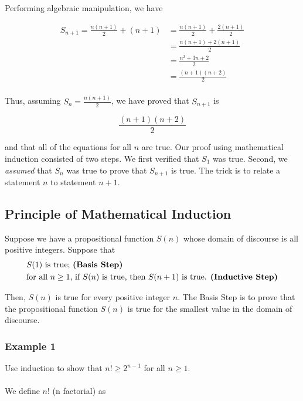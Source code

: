 Performing algebraic manipulation, we have

\begin{align*}
    S_{n + 1} = \frac{n(n + 1)}{2} + (n + 1) &= \frac{n(n + 1)}{2} + \frac{2(n + 1)}{2}\\
    &= \frac{n(n + 1) + 2(n + 1)}{2}\\
    &= \frac{n^2 + 3n + 2}{2}\\
    &= \frac{(n + 1)(n + 2)}{2}\\
\end{align*}

Thus, assuming $S_n = \frac{n(n + 1)}{2}$, we have proved that $S_{n + 1}$ is

\[
    \frac{(n + 1)(n + 2)}{2}
\]

and that all of the equations for all $n$ are true.  Our proof using mathematical induction consisted of two steps.  We first verified that $S_1$ was true.  Second, we \textit{assumed} that $S_n$ was true to prove that $S_{n + 1}$ is true.  The trick is to relate a statement $n$ to statement $n + 1$.

\subsection*{Principle of Mathematical Induction}

Suppose we have a propositional function $S(n)$ whose domain of discourse is all positive integers.  Suppose that
\begin{align*}
    &\text{$S(1)$ is true; \textbf{(Basis Step)}}\\
    &\text{for all $n \geq 1$, if $S(n)$ is true, then $S(n + 1)$ is true. \textbf{(Inductive Step)}}\\
\end{align*}

Then, $S(n)$ is true for every positive integer $n$.  The Basis Step is to prove that the propositional function $S(n)$ is true for the smallest value in the domain of discourse.

\clearpage

\subsubsection*{Example 1}

Use induction to show that $n! \geq 2^{n - 1}$ for all $n \geq 1$.\\\\We define $n!$ (n factorial) as

